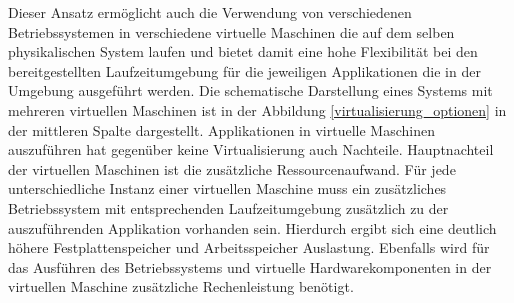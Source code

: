  Dieser Ansatz ermöglicht auch die Verwendung von verschiedenen Betriebssystemen in verschiedene virtuelle Maschinen die auf dem selben physikalischen System laufen und bietet damit eine hohe Flexibilität bei den bereitgestellten Laufzeitumgebung für die jeweiligen Applikationen die in der Umgebung ausgeführt werden. Die schematische Darstellung eines Systems mit mehreren virtuellen Maschinen ist in der Abbildung \ref{virtualisierung_optionen} in der mittleren Spalte dargestellt. Applikationen in virtuelle Maschinen auszuführen hat gegenüber keine Virtualisierung auch Nachteile. Hauptnachteil der virtuellen Maschinen ist die zusätzliche Ressourcenaufwand. Für jede unterschiedliche Instanz einer virtuellen Maschine muss ein zusätzliches Betriebssystem mit entsprechenden Laufzeitumgebung zusätzlich zu der auszuführenden Applikation vorhanden sein. Hierdurch ergibt sich eine deutlich höhere Festplattenspeicher und Arbeitsspeicher Auslastung. Ebenfalls wird für das Ausführen des Betriebssystems und virtuelle Hardwarekomponenten in der virtuellen Maschine zusätzliche Rechenleistung benötigt. \cite{Mavridis2019} 

